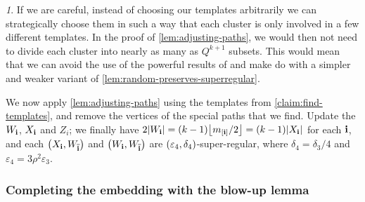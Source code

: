 \documentclass[11pt,english]{article}
\theoremstyle{plain}
\theoremstyle{plain}
\theoremstyle{plain}
\theoremstyle{plain}
\theoremstyle{plain}
\theoremstyle{definition}
\theoremstyle{definition}
\theoremstyle{remark}
\newtheorem{rem}[thm]{\protect\remarkname}
\theoremstyle{remark}
\theoremstyle{plain}
\theoremstyle{definition}
\theoremstyle{definition}
\theoremstyle{plain}
\theoremstyle{plain}
\theoremstyle{plain}
\theoremstyle{plain}
\theoremstyle{remark}
\newtheorem{myrem}[mythm]{\protect\remarkname}
\renewenvironment{rem}{\begin{myrem}}{\end{myrem}}
\theoremstyle{plain}
\theoremstyle{definition}
\let\originalleft\left
\let\originalright\right
\renewcommand{\left}{\mathopen{}\mathclose\bgroup\originalleft}
\renewcommand{\right}{\aftergroup\egroup\originalright}
\providecommand{\remarkname}{Remark}
\begin{document}
\begin{rem}
If we are careful, instead of choosing our templates arbitrarily we
can strategically choose them in such a way that each cluster is only
involved in a few different templates. In the proof of \ref{lem:adjusting-paths},
we would then not need to divide each cluster into nearly as many
as $Q^{k+1}$ subsets. This would mean that we can avoid the use of
the powerful results of \cite{GKRS07} and make do with a simpler
and weaker variant of \ref{lem:random-preserves-superregular}.
\end{rem}
We now apply \ref{lem:adjusting-paths} using the templates from \ref{claim:find-templates},
and remove the vertices of the special paths that we find. Update
the $W_{\mathbf{i}}$, $X_{\mathbf{i}}$ and $Z_{i}$; we finally have $2\left|W_{\bi}\right|=\left(k-1\right)\floor{m_{\left[\bi\right]}/2}=\left(k-1\right)\left|X_{\bi}\right|$
for each $\mathbf{i}$, and each $\left(X_{\bi},W_{\flip{\bi}}\right)$ and
$\left(W_{\bi},W_{\flip{\bi}}\right)$ are $\left(\varepsilon_{4},\delta_{4}\right)$-super-regular,
where $\delta_{4}=\delta_{3}/4$ and $\varepsilon_{4}=3\rho^{2}\varepsilon_{3}$.


\subsubsection{Completing the embedding with the blow-up lemma\label{sub:blow-up}}
\end{document}
